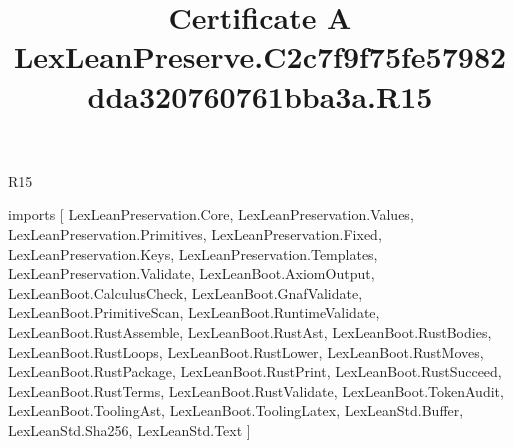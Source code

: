 \begin{lexlean}{R15}
\title{Certificate A LexLeanPreserve.C2c7f9f75fe57982dda320760761bba3a.R15}
\begin{coremodule}
imports [
  LexLeanPreservation.Core,
  LexLeanPreservation.Values,
  LexLeanPreservation.Primitives,
  LexLeanPreservation.Fixed,
  LexLeanPreservation.Keys,
  LexLeanPreservation.Templates,
  LexLeanPreservation.Validate,
  LexLeanBoot.AxiomOutput,
  LexLeanBoot.CalculusCheck,
  LexLeanBoot.GnafValidate,
  LexLeanBoot.PrimitiveScan,
  LexLeanBoot.RuntimeValidate,
  LexLeanBoot.RustAssemble,
  LexLeanBoot.RustAst,
  LexLeanBoot.RustBodies,
  LexLeanBoot.RustLoops,
  LexLeanBoot.RustLower,
  LexLeanBoot.RustMoves,
  LexLeanBoot.RustPackage,
  LexLeanBoot.RustPrint,
  LexLeanBoot.RustSucceed,
  LexLeanBoot.RustTerms,
  LexLeanBoot.RustValidate,
  LexLeanBoot.TokenAudit,
  LexLeanBoot.ToolingAst,
  LexLeanBoot.ToolingLatex,
  LexLeanStd.Buffer,
  LexLeanStd.Sha256,
  LexLeanStd.Text
]


\end{coremodule}
\end{lexlean}
